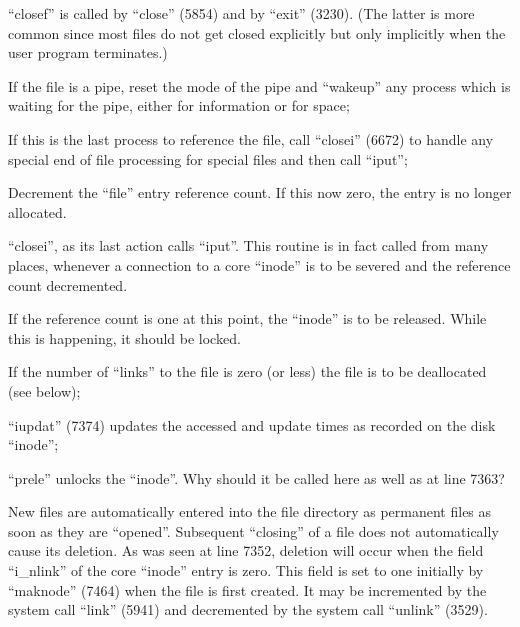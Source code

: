 
``closef'' is called by ``close'' (5854)
and by ``exit'' (3230). (The latter is
more common since most files do not get
closed explicitly but only implicitly
when the user program terminates.)


\bd
\item[6649:] If the file is a pipe, reset the
mode of the pipe and ``wakeup'' any
process which is waiting for the
pipe, either for information or
for space;

\item[6655:] If this is the last process to
 reference the file, call ``closei''
 (6672) to handle any special end
 of file processing for special
 files and then call ``iput'';

\item[6657:] Decrement the ``file'' entry reference count. If this now zero, the
 entry is no longer allocated.
\ed



``closei'', as its last action calls
``iput''. This routine is in fact called
from many places, whenever a connection
to a core ``inode'' is to be severed and
the reference count decremented.


\bd
\item[7350:] If the reference count is one at
 this point, the ``inode'' is to be
 released. While this is happening, it should be locked.

 \item[7352:] If the number of ``links'' to the
 file is zero (or less) the file
 is to be deallocated (see below);

\item[7357:] ``iupdat'' (7374) updates the
 accessed and update times as
recorded on the disk ``inode'';

\item[7358:] ``prele'' unlocks the ``inode''. Why
 should it be called here as well
 as at line 7363?
\ed



New files are automatically entered
into the file directory as permanent
files as soon as they are ``opened''.
Subsequent ``closing'' of a file does not
automatically cause its deletion. As
was seen at line 7352, deletion will
occur when the field ``i\_nlink'' of the
core ``inode'' entry is zero. This field
is set to one initially by ``maknode''
(7464) when the file is first created.
It may be incremented by the system
call ``link'' (5941) and decremented by
the system call ``unlink'' (3529).


